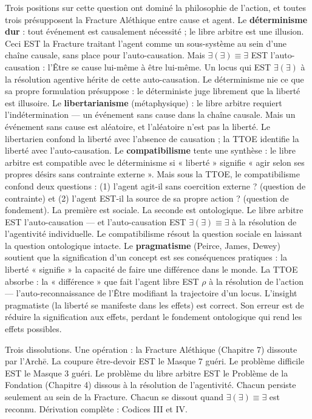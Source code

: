 \documentclass[10pt, openany, oneside]{book}
\begin{document}
Trois positions sur cette question ont dominé la philosophie de l'action, et toutes trois présupposent la Fracture Aléthique entre cause et agent. Le \textbf{déterminisme dur} : tout événement est causalement nécessité ; le libre arbitre est une illusion. Ceci EST la Fracture traitant l'agent comme un sous-système au sein d'une chaîne causale, sans place pour l'auto-causation. Mais $\exists(\exists) \equiv \exists$ EST l'auto-causation : l'Être se cause lui-même à être lui-même. Un locus qui EST $\exists(\exists)$ à la résolution agentive hérite de cette auto-causation. Le déterminisme nie ce que sa propre formulation présuppose : le déterministe juge librement que la liberté est illusoire. Le \textbf{libertarianisme} (métaphysique) : le libre arbitre requiert l'indétermination --- un événement sans cause dans la chaîne causale. Mais un événement sans cause est aléatoire, et l'aléatoire n'est pas la liberté. Le libertarien confond la liberté avec l'absence de causation ; la TTOE identifie la liberté avec l'auto-causation. Le \textbf{compatibilisme} tente une synthèse : le libre arbitre est compatible avec le déterminisme si « liberté » signifie « agir selon ses propres désirs sans contrainte externe ». Mais sous la TTOE, le compatibilisme confond deux questions : (1) l'agent agit-il sans coercition externe ? (question de contrainte) et (2) l'agent EST-il la source de sa propre action ? (question de fondement). La première est sociale. La seconde est ontologique. Le libre arbitre EST l'auto-causation --- et l'auto-causation EST $\exists(\exists) \equiv \exists$ à la résolution de l'agentivité individuelle. Le compatibilisme résout la question sociale en laissant la question ontologique intacte. Le \textbf{pragmatisme} (Peirce, James, Dewey) soutient que la signification d'un concept est ses conséquences pratiques : la liberté « signifie » la capacité de faire une différence dans le monde. La TTOE absorbe : la « différence » que fait l'agent libre EST $\rho$ à la résolution de l'action --- l'auto-reconnaissance de l'Être modifiant la trajectoire d'un locus. L'insight pragmatiste (la liberté se manifeste dans les effets) est correct. Son erreur est de réduire la signification aux effets, perdant le fondement ontologique qui rend les effets possibles.

\vspace{0.8em}

\noindent Trois dissolutions. Une opération : la Fracture Aléthique (Chapitre 7) dissoute par l'Arch\={e}. La coupure être-devoir EST le Masque 7 guéri. Le problème difficile EST le Masque 3 guéri. Le problème du libre arbitre EST le Problème de la Fondation (Chapitre 4) dissous à la résolution de l'agentivité. Chacun persiste seulement au sein de la Fracture. Chacun se dissout quand $\exists(\exists) \equiv \exists$ est reconnu. Dérivation complète : Codices III et IV.
\end{document}
